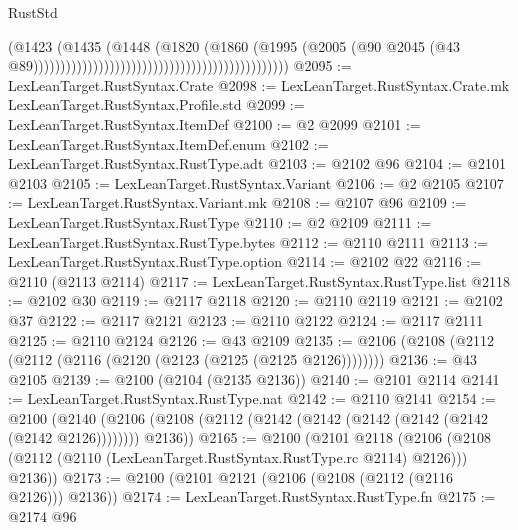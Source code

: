 \begin{lexlean}{RustStd}
\begin{coremodule}
{\begin{coremodule}
{{{{{{{{{{{{{{{{{{{{{{{{{{{{{{{{{{{{{{{{{{{{{{{{{{                                                                                (@1423
                                                                                  (@1435
                                                                                    (@1448
                                                                                      (@1820
                                                                                        (@1860
                                                                                          (@1995
                                                                                            (@2005
                                                                                              (@90
                                                                                                @2045
                                                                                                (@43
                                                                                                  @89)))))))))))))))))))))))))))))))))))))))))))))))
@2095 := LexLeanTarget.RustSyntax.Crate
@2098 := LexLeanTarget.RustSyntax.Crate.mk LexLeanTarget.RustSyntax.Profile.std
@2099 := LexLeanTarget.RustSyntax.ItemDef
@2100 := @2 @2099
@2101 := LexLeanTarget.RustSyntax.ItemDef.enum
@2102 := LexLeanTarget.RustSyntax.RustType.adt
@2103 := @2102 @96
@2104 := @2101 @2103
@2105 := LexLeanTarget.RustSyntax.Variant
@2106 := @2 @2105
@2107 := LexLeanTarget.RustSyntax.Variant.mk
@2108 := @2107 @96
@2109 := LexLeanTarget.RustSyntax.RustType
@2110 := @2 @2109
@2111 := LexLeanTarget.RustSyntax.RustType.bytes
@2112 := @2110 @2111
@2113 := LexLeanTarget.RustSyntax.RustType.option
@2114 := @2102 @22
@2116 := @2110 (@2113 @2114)
@2117 := LexLeanTarget.RustSyntax.RustType.list
@2118 := @2102 @30
@2119 := @2117 @2118
@2120 := @2110 @2119
@2121 := @2102 @37
@2122 := @2117 @2121
@2123 := @2110 @2122
@2124 := @2117 @2111
@2125 := @2110 @2124
@2126 := @43 @2109
@2135 := @2106 (@2108 (@2112 (@2112 (@2116 (@2120 (@2123 (@2125 (@2125 @2126))))))))
@2136 := @43 @2105
@2139 := @2100 (@2104 (@2135 @2136))
@2140 := @2101 @2114
@2141 := LexLeanTarget.RustSyntax.RustType.nat
@2142 := @2110 @2141
@2154 := @2100
    (@2140 (@2106 (@2108 (@2112 (@2142 (@2142 (@2142 (@2142 (@2142 (@2142 @2126)))))))) @2136))
@2165 := @2100
    (@2101
      @2118
      (@2106 (@2108 (@2112 (@2110 (LexLeanTarget.RustSyntax.RustType.rc @2114) @2126))) @2136))
@2173 := @2100 (@2101 @2121 (@2106 (@2108 (@2112 (@2116 @2126))) @2136))
@2174 := LexLeanTarget.RustSyntax.RustType.fn
@2175 := @2174 @96
}}}}}}}}}}}}}}}}}}}}}}}}}}}}}}}}}}}}}}}}}}}}}}}}}}
\end{coremodule}}
\end{coremodule}
\end{lexlean}

